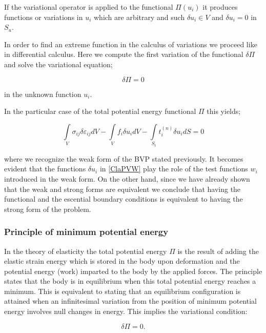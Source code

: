 If the variational operator is applied to the functional $\Pi (u_i)$ it produces functions or variations in $u_i$ which are arbitrary and such $\delta {u_i} \in V$ and $\delta {u_i} = 0$ in $S_u$.

In order to find an extreme function in the calculus of variations we proceed like in differential calculus. Here we compute the first variation of the functional $\delta \Pi$ and solve the variational equation;

\begin{equation}
\delta \Pi  = 0
\label{vareq}
\end{equation}

in the unknown function $u_i$. 

In the particular case of the total potential energy functional $\Pi$ this yields;

\begin{equation}
\int\limits_V {{\sigma _{ij}}\delta {\varepsilon _{ij}}dV}  - \int\limits_V {{f_i}\delta {u_i}dV}  - \int\limits_{{S_t}} {t_i^{(n)}\delta {u_i}dS}  = 0
\label{ClaPVW}
\end{equation}

where we recognize the weak form of the BVP stated previously. It becomes evident that the functions $\delta {u_i}$ in \cref{ClaPVW} play the role of the test functions $w_i$ introduced in the weak form. On the other hand, since we have already shown that the weak and strong forms are equivalent we conclude that having the functional and the escential boundary conditions is equivalent to having the strong form of the problem.


\subsubsection*{Principle of minimum potential energy}
In the theory of elasticity the total potential energy $\Pi$ is the result of adding the elastic strain energy which is stored in the body upon deformation and the potential energy (work) imparted to the body by the applied forces. The principle states that the body is in equilibrium when this total potential energy reaches a minimum. This is equivalent to stating that an equilibrium configuration is attained when an infinitesimal variation from the position of minimum potential energy involves null changes in energy. This implies the variational condition:

\begin{equation}
\delta \Pi  = 0.
\label{vareq2}
\end{equation}

